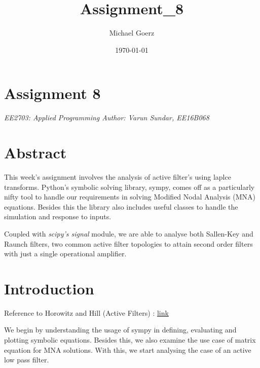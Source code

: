 \documentclass[10pt,notitlepage,onecolumn,aps,pra]{revtex4-1}
\begin{document}
    
    
    \title{Assignment\_8}\author{Michael Goerz}

\date{\today}
\maketitle


    
    

    
    \hypertarget{assignment-8}{%
\section{Assignment 8}\label{assignment-8}}

\emph{EE2703: Applied Programming Author: Varun Sundar, EE16B068}

\hypertarget{abstract}{%
\section{Abstract}\label{abstract}}

This week's assignment involves the analysis of active filter's using
laplce transforms. Python's symbolic solving library, sympy, comes off
as a particularly nifty tool to handle our requirements in solving
Modified Nodal Analysis (MNA) equations. Besides this the library also
includes useful classes to handle the simulation and response to inputs.

Coupled with \emph{scipy's signal} module, we are able to analyse both
Sallen-Key and Raunch filters, two common active filter topologies to
attain second order filters with just a single operational amplifier.

\hypertarget{introduction}{%
\section{Introduction}\label{introduction}}

Reference to Horowitz and Hill (Active Filters) :
\href{https://artofelectronics.net/}{link}

We begin by understanding the usage of sympy in defining, evaluating and
plotting symbolic equations. Besides this, we also examine the use case
of matrix equation for MNA solutions. With this, we start analysing the
case of an active low pass filter.
\end{document}
